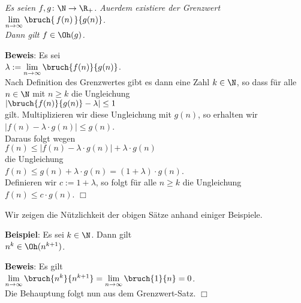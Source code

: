 \begin{Proposition} \label{limit}
{\em
  Es seien $f,g \colon \N \rightarrow {\R_+}$.  Au\3erdem existiere der Grenzwert \\[0.1cm]
  \hspace*{1.3cm} $\lim\limits_{n \rightarrow \infty} \bruch{\,f(n)\,}{g(n)}$.  \\[0.1cm]
  Dann gilt $f \in \Oh(g)$. 
}
\end{Proposition}
\textbf{Beweis}: Es sei \\[0.1cm]
\hspace*{1.3cm} $\lambda := \lim\limits_{n \rightarrow \infty} \bruch{f(n)}{g(n)}$.  \\[0.1cm]
Nach Definition des Grenzwertes gibt es dann eine Zahl $k \in \N$, so dass 
f\"ur alle $n\in \N$ mit $n \geq k$ die Ungleichung \\[0.1cm]
\hspace*{1.3cm} $\left| \bruch{f(n)}{g(n)} - \lambda \right| \leq 1$ \\[0.1cm]
gilt.  Multiplizieren wir diese Ungleichung mit $g(n)$, so erhalten wir \\[0.1cm]
\hspace*{1.3cm} $|f(n) - \lambda \cdot g(n)| \leq g(n)$. \\[0.1cm]
Daraus folgt wegen \\[0.1cm]
\hspace*{1.3cm} $f(n) \leq \bigl|f(n) - \lambda \cdot g(n)\bigr| + \lambda \cdot g(n)$ \\[0.1cm]
die Ungleichung \\[0.1cm]
\hspace*{1.3cm} $f(n) \leq g(n) + \lambda \cdot g(n) = (1 + \lambda) \cdot g(n)$. \\[0.1cm]
Definieren wir  $c := 1 +  \lambda$, 
so folgt f\"ur alle $n \geq k$ die Ungleichung $f(n) \leq c \cdot g(n)$. \hspace*{\fill} $\Box$
\vspace*{0.3cm}

\noindent
Wir zeigen die N\"utzlichkeit der obigen S\"atze anhand einiger Beispiele.
\vspace*{0.3cm}

\noindent
\textbf{Beispiel}: Es sei $k \in \N$.  Dann gilt\\[0.1cm]
\hspace*{1.3cm} $n^k \in \Oh(n^{k+1})$.
\vspace*{0.3cm}

\noindent
\textbf{Beweis}: Es gilt \\[0.1cm]
\hspace*{1.3cm} 
$\lim\limits_{n \rightarrow \infty} \bruch{n^{k}}{n^{k+1}} = \lim\limits_{n \rightarrow   \infty} \bruch{1}{n} = 0$.
\\[0.1cm]
Die Behauptung folgt nun aus dem Grenzwert-Satz. \hspace*{\fill} $\Box$
\vspace*{0.3cm}

